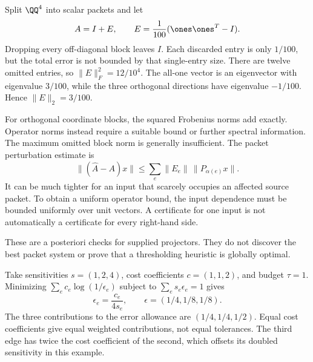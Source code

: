 Split $\QQ^4$ into scalar packets and let
\[
A=I+E,\qquad E=\frac1{100}(\ones\ones^T-I).
\]
Dropping every off-diagonal block leaves $I$. Each discarded entry is only $1/100$, but the total error is not bounded by that single-entry size.
There are twelve omitted entries, so $\|E\|_F^2=12/10^4$. The all-one vector is an eigenvector with eigenvalue $3/100$, while the three orthogonal directions have eigenvalue $-1/100$. Hence $\|E\|_2=3/100$.

For orthogonal coordinate blocks, the squared Frobenius norms add exactly. Operator norms instead require a suitable bound or further spectral information. The maximum omitted block norm is generally insufficient.
The packet perturbation estimate is
\[
\|(\widehat A-A)x\|\le\sum_e\|E_e\|\,\|P_{\alpha(e)}x\|.
\]
It can be much tighter for an input that scarcely occupies an affected source packet. To obtain a uniform operator bound, the input dependence must be bounded uniformly over unit vectors. A certificate for one input is not automatically a certificate for every right-hand side.

These are a posteriori checks for supplied projectors. They do not discover the best packet system or prove that a thresholding heuristic is globally optimal.

Take sensitivities $s=(1,2,4)$, cost coefficients $c=(1,1,2)$, and budget $\tau=1$. Minimizing $\sum_ec_e\log(1/\epsilon_e)$ subject to $\sum_es_e\epsilon_e=1$ gives
\[
\epsilon_e=\frac{c_e}{4s_e},\qquad
\epsilon=(1/4,1/8,1/8).
\]
The three contributions to the error allowance are $(1/4,1/4,1/2)$. Equal cost coefficients give equal weighted contributions, not equal tolerances. The third edge has twice the cost coefficient of the second, which offsets its doubled sensitivity in this example.

